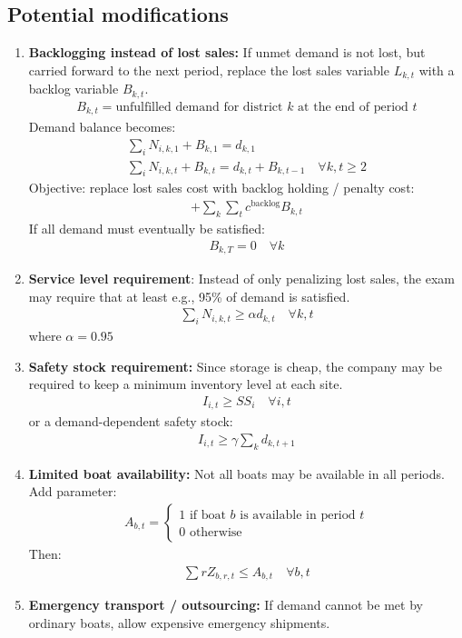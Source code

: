 \documentclass[10pt]{article}
\begin{document}
\subsection{Potential modifications}
\begin{enumerate}
    \item \textbf{Backlogging instead of lost sales:} If unmet demand is not lost, but carried forward to the next period, replace the lost sales variable $L_{k, t} $ with a backlog variable $B_{k, t} $.
    \begin{gather*}
        B_{k, t} = \text{unfulfilled demand for district $k $ at the end of period }t
    \end{gather*}
    Demand balance becomes: 
    \begin{gather*}
        \sum_i N_{i, k, 1} + B_{k, 1} = d_{k, 1}\\
        \sum_i N_{i, k, t} + B_{k, t} = d_{k, t} + B_{k, t - 1} \quad\forall k, t \ge 2
    \end{gather*}
    Objective: replace lost sales cost with backlog holding / penalty cost: 
    \begin{gather*}
        + \sum_k\sum_t c^{\text{backlog}} B_{k, t}
    \end{gather*}
    If all demand must eventually be satisfied: 
    \begin{gather*}
        B_{k, T} = 0 \quad\forall k
    \end{gather*}
    \item \textbf{Service level requirement}: Instead of only penalizing lost sales, the exam may require that at least e.g., 95\% of demand is satisfied. 
    \begin{gather*}
        \sum_i N_{i, k, t} \ge \alpha d_{k, t}\quad\forall k, t
    \end{gather*}
    where $\alpha = 0.95 $
    \item \textbf{Safety stock requirement:} Since storage is cheap, the company may be required to keep a minimum inventory level at each site.
    \begin{gather*}
        I_{i, t} \ge SS_i\quad\forall i, t
    \end{gather*}
    or a demand-dependent safety stock: 
    \begin{gather*}
        I_{i, t} \ge \gamma\sum_k d_{k, t + 1}
    \end{gather*}
    \item \textbf{Limited boat availability:} Not all boats may be available in all periods. Add parameter:
    \begin{gather*}
        A_{b, t} = \begin{cases}
            1\text{ if boat $b $ is available in period }t\\
            0\text{ otherwise}
        \end{cases}
    \end{gather*}
    Then: 
    \begin{gather*}
        \sum r Z_{b, r, t} \le A_{b, t} \quad\forall b, t
    \end{gather*}
    \newpage
    \item \textbf{Emergency transport / outsourcing:} If demand cannot be met by ordinary boats, allow expensive emergency shipments. 


\end{enumerate}
\end{document}
